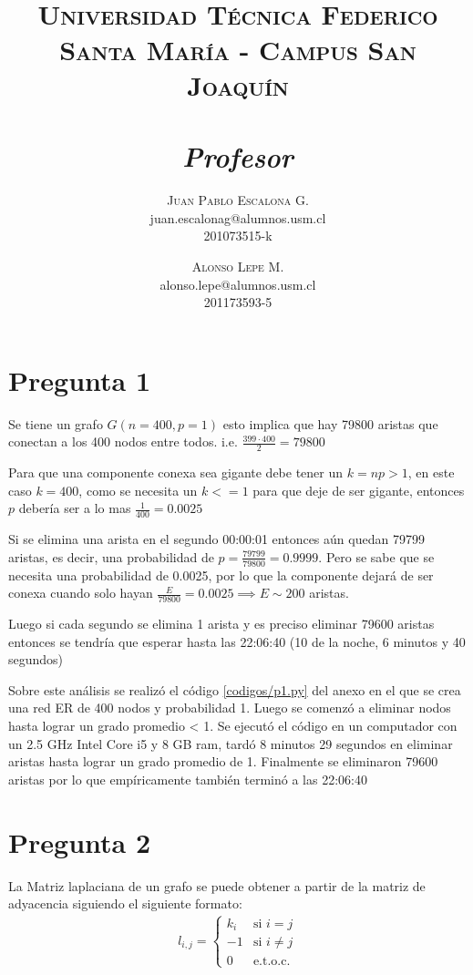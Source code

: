 \documentclass[letterpaper]{article}
\title{
    \textmd{\textbf{\guiaRamo\\ \guiaTitulo}}\\
    \vspace{0.1in}
    \large{\textsc{Universidad Técnica Federico Santa María - Campus San Joaquín}}\\
    \normalsize\vspace{0.1in}\small{\guiaFecha}\\
    \vspace{0.1in}\large{\textit{Profesor \guiaProfesor}}
}
\author{
    \textsc{Juan Pablo Escalona G.} \\
    \small{juan.escalonag@alumnos.usm.cl} \\
    {\small 201073515-k}
    \and
     \textsc{Alonso Lepe M.} \\
    \small{alonso.lepe@alumnos.usm.cl}\\
    {\small 201173593-5}
\vspace{.5in}
}
\date{}
\begin{document}
\maketitle
\section{Pregunta 1}
Se tiene un grafo $G(n=400,p=1)$ esto implica que hay 79800 aristas que conectan a los 400 nodos entre todos. i.e. $\frac{399 \cdot 400}{2} = 79800$

Para que una componente conexa sea gigante debe tener un $k = np > 1$, en este caso $k = 400$, como se necesita un $k <= 1$ para que deje de ser gigante, entonces $p$ debería ser a lo mas $\frac{1}{400} = 0.0025$

Si se elimina una arista en el segundo 00:00:01 entonces aún quedan 79799 aristas, es decir, una probabilidad de $p = \frac{79799}{79800} = 0.9999$. Pero se sabe que se necesita una probabilidad de 0.0025, por lo que la componente dejará de ser conexa cuando solo hayan $\frac{E}{79800} = 0.0025 \implies E \sim 200$ aristas.

Luego si cada segundo se elimina 1 arista y es preciso eliminar 79600 aristas entonces se tendría que esperar hasta las 22:06:40 (10 de la noche, 6 minutos y 40 segundos)

Sobre este análisis se realizó el código \ref{codigos/p1.py} del anexo en el que se crea una red ER de 400 nodos y probabilidad 1. Luego se comenzó a eliminar nodos hasta lograr un grado promedio < 1. Se ejecutó el código en un computador con un 2.5 GHz Intel Core i5 y 8 GB ram, tardó 8 minutos 29 segundos en eliminar aristas hasta lograr un grado promedio de 1. Finalmente se eliminaron 79600 aristas por lo que empíricamente también terminó a las 22:06:40

\section{Pregunta 2}
La Matriz laplaciana de un grafo se puede obtener a partir de la matriz de adyacencia siguiendo el siguiente formato:
\begin{align}
  l_{i,j} =
  \begin{cases}
    k_i  & \text{si } i = j  \\
    -1  & \text{si } i \neq j  \\
    0  & \text{e.t.o.c.}
  \end{cases}
\end{align}
\end{document}
